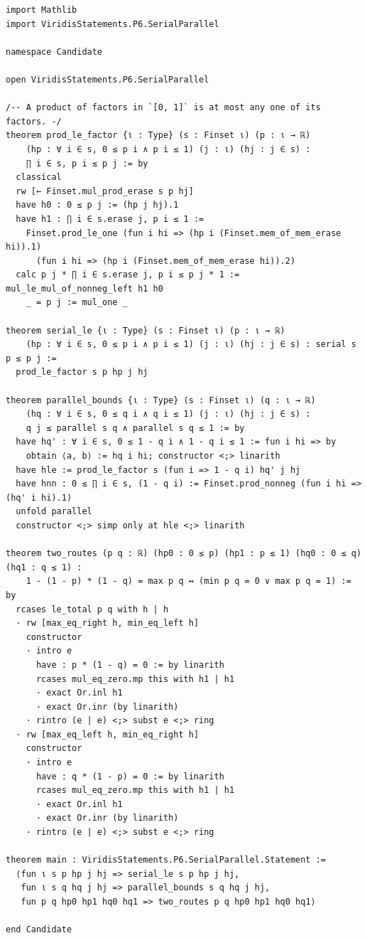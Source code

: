 \documentclass[11pt]{article}
\begin{document}
\begin{lstlisting}
import Mathlib
import ViridisStatements.P6.SerialParallel

namespace Candidate

open ViridisStatements.P6.SerialParallel

/-- A product of factors in `[0, 1]` is at most any one of its factors. -/
theorem prod_le_factor {ι : Type} (s : Finset ι) (p : ι → ℝ)
    (hp : ∀ i ∈ s, 0 ≤ p i ∧ p i ≤ 1) (j : ι) (hj : j ∈ s) :
    ∏ i ∈ s, p i ≤ p j := by
  classical
  rw [← Finset.mul_prod_erase s p hj]
  have h0 : 0 ≤ p j := (hp j hj).1
  have h1 : ∏ i ∈ s.erase j, p i ≤ 1 :=
    Finset.prod_le_one (fun i hi => (hp i (Finset.mem_of_mem_erase hi)).1)
      (fun i hi => (hp i (Finset.mem_of_mem_erase hi)).2)
  calc p j * ∏ i ∈ s.erase j, p i ≤ p j * 1 := mul_le_mul_of_nonneg_left h1 h0
    _ = p j := mul_one _

theorem serial_le {ι : Type} (s : Finset ι) (p : ι → ℝ)
    (hp : ∀ i ∈ s, 0 ≤ p i ∧ p i ≤ 1) (j : ι) (hj : j ∈ s) : serial s p ≤ p j :=
  prod_le_factor s p hp j hj

theorem parallel_bounds {ι : Type} (s : Finset ι) (q : ι → ℝ)
    (hq : ∀ i ∈ s, 0 ≤ q i ∧ q i ≤ 1) (j : ι) (hj : j ∈ s) :
    q j ≤ parallel s q ∧ parallel s q ≤ 1 := by
  have hq' : ∀ i ∈ s, 0 ≤ 1 - q i ∧ 1 - q i ≤ 1 := fun i hi => by
    obtain ⟨a, b⟩ := hq i hi; constructor <;> linarith
  have hle := prod_le_factor s (fun i => 1 - q i) hq' j hj
  have hnn : 0 ≤ ∏ i ∈ s, (1 - q i) := Finset.prod_nonneg (fun i hi => (hq' i hi).1)
  unfold parallel
  constructor <;> simp only at hle <;> linarith

theorem two_routes (p q : ℝ) (hp0 : 0 ≤ p) (hp1 : p ≤ 1) (hq0 : 0 ≤ q) (hq1 : q ≤ 1) :
    1 - (1 - p) * (1 - q) = max p q ↔ (min p q = 0 ∨ max p q = 1) := by
  rcases le_total p q with h | h
  · rw [max_eq_right h, min_eq_left h]
    constructor
    · intro e
      have : p * (1 - q) = 0 := by linarith
      rcases mul_eq_zero.mp this with h1 | h1
      · exact Or.inl h1
      · exact Or.inr (by linarith)
    · rintro (e | e) <;> subst e <;> ring
  · rw [max_eq_left h, min_eq_right h]
    constructor
    · intro e
      have : q * (1 - p) = 0 := by linarith
      rcases mul_eq_zero.mp this with h1 | h1
      · exact Or.inl h1
      · exact Or.inr (by linarith)
    · rintro (e | e) <;> subst e <;> ring

theorem main : ViridisStatements.P6.SerialParallel.Statement :=
  ⟨fun ι s p hp j hj => serial_le s p hp j hj,
   fun ι s q hq j hj => parallel_bounds s q hq j hj,
   fun p q hp0 hp1 hq0 hq1 => two_routes p q hp0 hp1 hq0 hq1⟩

end Candidate
\end{lstlisting}
\end{document}
